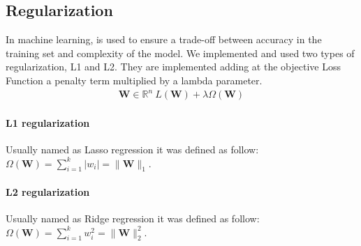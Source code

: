 \subsection{Regularization}
 In machine learning, is used to ensure a trade-off between accuracy in the training set and complexity of the model.
 We implemented and used two types of regularization, L1 and L2. They are implemented adding at the objective Loss Function a penalty term multiplied by a lambda parameter.
\begin{align*}
	{\mathbf{W} \in \mathbb{R}^n} {\ \mathit{L}(\mathbf{W}) + \lambda\Omega(\mathbf{W})}{}{}
	\label{eq:reg}
\end{align*}
 
\paragraph*{L1 regularization}
Usually named as Lasso regression it was defined as follow:
$\Omega(\textbf{W}) = \sum_{i=1}^{k} |w_i| = \|\textbf{W}\|_1$.
\paragraph*{L2 regularization}
Usually named as Ridge regression it was defined as follow:
$\Omega(\textbf{W}) = \sum_{i=1}^{k}w_i^2 = \|\textbf{W}\|_2^2$. 
 
 
